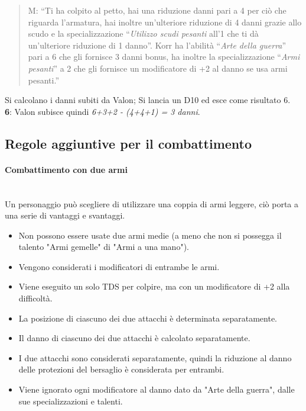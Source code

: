 \documentclass[../manuale_main.tex]{subfiles}
\begin{document}
\begin{framed}
\begin{quote}
M: ``Ti ha colpito al petto, hai una riduzione danni pari a 4 per ciò che riguarda l'armatura, hai inoltre un'ulteriore riduzione di 4 danni grazie allo scudo e la specializzazione ``\emph{Utilizzo scudi pesanti} all'1 che ti dà un'ulteriore riduzione di 1 danno''. Korr ha l'abilità ``\emph{Arte della guerra}'' pari a 6 che gli fornisce 3 danni bonus, ha inoltre la specializzazione ``\emph{Armi pesanti}'' a 2 che gli fornisce un modificatore di +2 al danno se usa armi pesanti.''\\
\end{quote}
Si calcolano i danni subiti da Valon; Si lancia un D10 ed esce come risultato 6.\\
\textbf{6}: Valon subisce quindi \textit{6+3+2 - (4+4+1) = 3 danni}.\\
\end{framed}


\clearpage

\subsection{Regole aggiuntive per il combattimento}
\paragraph{Combattimento con due armi}\mbox{}\\
Un personaggio può scegliere di utilizzare una coppia di armi leggere, ciò porta a una serie di vantaggi e svantaggi.
\begin{itemize}
\item Non possono essere usate due armi medie (a meno che non si possegga il talento "Armi gemelle" di "Armi a una mano").
\item Vengono considerati i modificatori di entrambe le armi.
\item Viene eseguito un solo TDS per colpire, ma con un modificatore di +2 alla difficoltà.
\item La posizione di ciascuno dei due attacchi è determinata separatamente.
\item Il danno di ciascuno dei due attacchi è calcolato separatamente.
\item I due attacchi sono considerati separatamente, quindi la riduzione al danno delle protezioni del bersaglio è considerata per entrambi.
\item Viene ignorato ogni modificatore al danno dato da "Arte della guerra", dalle sue specializzazioni e talenti.
\end{itemize}
\end{document}
